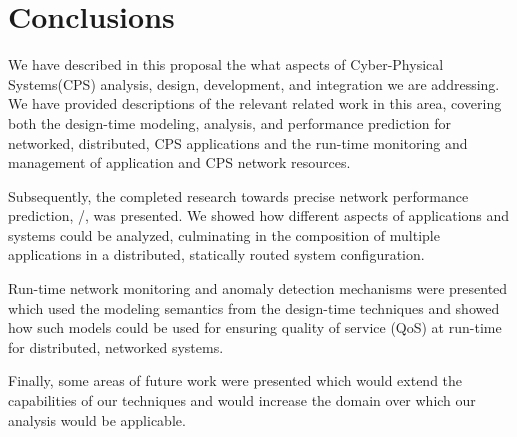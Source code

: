 \chapter{Conclusions}
\label{ch:conclusions}

We have described in this proposal the what aspects of Cyber-Physical
Systems(CPS) analysis, design, development, and integration we are
addressing.  We have provided descriptions of the relevant related
work in this area, covering both the design-time modeling, analysis,
and performance prediction for networked, distributed, CPS
applications and the run-time monitoring and management of application
and CPS network resources.

Subsequently, the completed research towards precise network
performance prediction, \shorttool/, was presented.  We showed how
different aspects of applications and systems could be analyzed,
culminating in the composition of multiple applications in a
distributed, statically routed system configuration.

Run-time network monitoring and anomaly detection mechanisms were
presented which used the modeling semantics from the design-time
techniques and showed how such models could be used for ensuring
quality of service (QoS) at run-time for distributed, networked
systems.

Finally, some areas of future work were presented which would extend
the capabilities of our techniques and would increase the domain over
which our analysis would be applicable.  

